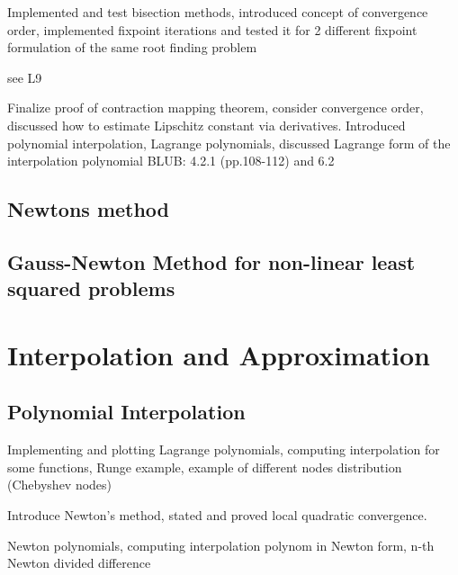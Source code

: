 \documentclass{article}
\theoremstyle{remark}
\begin{document}
\begin{tcolorbox}
  Implemented and test bisection methods, introduced concept of convergence order, implemented fixpoint iterations and tested it for 2 different fixpoint formulation of the same root finding problem 
  \par
  see L9
\end{tcolorbox}

\begin{tcolorbox}
  Finalize proof of contraction mapping theorem, consider convergence order, discussed how to estimate Lipschitz constant via derivatives. Introduced polynomial interpolation, Lagrange polynomials, discussed Lagrange form of the interpolation polynomial	
  BLUB: 4.2.1 (pp.108-112) and 6.2
\end{tcolorbox}
\subsection{Newtons method}%
\label{sub:newtons_method}

\subsection{Gauss-Newton Method for non-linear least squared problems}%
\label{sub:gauss_newton_method_for_non_linear_least_squared_problems}

\newpage
\section{Interpolation and Approximation}%
\label{sec:interpolation_and_approximation}

\subsection{Polynomial Interpolation}%
\label{sub:polynomial_interpolation}

\begin{tcolorbox}
  Implementing and plotting Lagrange polynomials, computing interpolation for some functions, Runge example, example of different nodes distribution (Chebyshev nodes)	
\end{tcolorbox}

\begin{tcolorbox}
   Introduce Newton's method, stated and proved local quadratic convergence. 	
\end{tcolorbox}

\begin{tcolorbox}
  Newton polynomials, computing interpolation polynom in Newton form, n-th Newton divided difference	
\end{tcolorbox}
\end{document}
